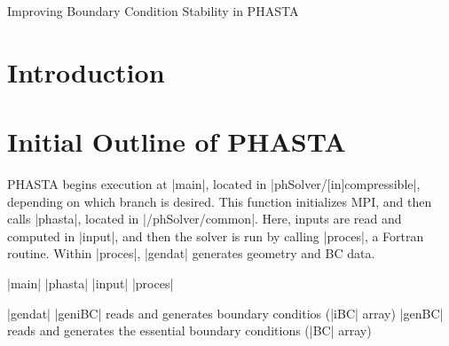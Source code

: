 \documentclass[11pt]{article}
\begin{document}
{
	\fancyhf[LH]{\rightmark}
	\fancyhf[CH]{}
	\fancyhf[RH]{\thepage\hspace*{1ex}/\hspace*{1ex}\pageref{lastpage}}
	\fancyhf[LF]{}
	\fancyhf[CF]{}
	\fancyhf[RF]{}
}

{
	\fancyhf[CH]{}
	\fancyhf[LF]{}
	\fancyhf[CF]{}
	\fancyhf[RF]{}
}

\pagestyle{allpages}
\thispagestyle{firstpage}
\renewcommand{\sectionmark}[1]{ \markright{#1}{} }


\vspace*{0in}
\begin{center}
\LARGE Improving Boundary Condition Stability in PHASTA
\end{center}
\vspace*{0.3in}

\section{Introduction} %

\section{Initial Outline of PHASTA} %

PHASTA begins execution at |main|, located in |phSolver/[in]compressible|, depending on which branch is desired. This function initializes MPI, and then calls |phasta|, located in |/phSolver/common|. Here, inputs are read and computed in |input|, and then the solver is run by calling |proces|, a Fortran routine. Within |proces|, |gendat| generates geometry and BC data.
\begin{outline}[deep]
\1 |main|
	\2 |phasta|
		\3 |input|
		\3 |proces|
\end{outline}
		
\begin{outline}[deep]
\1 |gendat|
	\2 |geniBC| reads and generates boundary conditios (|iBC| array)
	\2 |genBC| reads and generates the essential boundary conditions (|BC| array)
\end{outline}

\label{lastpage}
\end{document}
